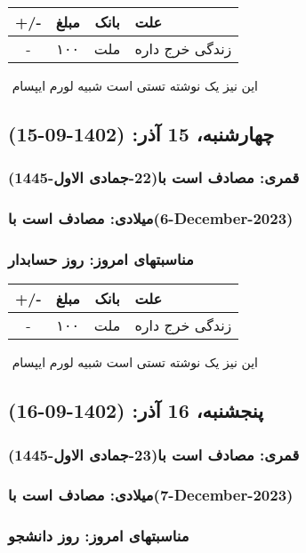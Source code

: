 \documentclass{article}
\newcommand{\rnote}[1]{\marginpar{\textcolor{color}{\StrSubstitute{\##1}{ }{\_}}}}
\newcommand{\myRow}[4]{
    #1 & #2 & #3 & #4 \\ \hline
}
\begin{document}
\begin{tabular}{ | c | c | c | p{5cm} |}
    \hline
    \myRow{ +/- }{مبلغ}{بانک}{علت}
    \myRow{-}{۱۰۰}{ملت}{زندگی خرج داره}
\end{tabular}
\newline
\newline

‌
\rnote{تست}
این نیز یک نوشته تستی است شبیه لورم ایپسام




\newpage
{}
\textcolor{color}{
\section{ چهارشنبه، 15 آذر: (1402-09-15) }
\subsubsection*{قمری: مصادف است با(22-جمادی الاول-1445)} 
\subsubsection*{میلادی: مصادف است با(6-December-2023)}
\subsubsection*{مناسبتهای امروز: روز حسابدار}
}


\begin{tabular}{ | c | c | c | p{5cm} |}
    \hline
    \myRow{ +/- }{مبلغ}{بانک}{علت}
    \myRow{-}{۱۰۰}{ملت}{زندگی خرج داره}
\end{tabular}
\newline
\newline

‌
\rnote{تست}
این نیز یک نوشته تستی است شبیه لورم ایپسام




\newpage
{}
\textcolor{color}{
\section{ پنجشنبه، 16 آذر: (1402-09-16) }
\subsubsection*{قمری: مصادف است با(23-جمادی الاول-1445)} 
\subsubsection*{میلادی: مصادف است با(7-December-2023)}
\subsubsection*{مناسبتهای امروز: روز دانشجو}
}
\end{document}
